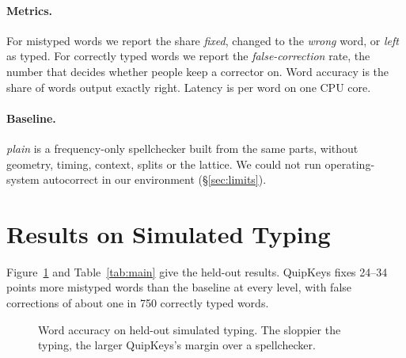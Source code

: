 \documentclass[11pt,a4paper]{article}
\newcommand{\qk}{QuipKeys}
\begin{document}
\paragraph{Metrics.} For mistyped words we report the share \emph{fixed}, changed to the \emph{wrong} word, or \emph{left} as typed. For correctly typed words we report the \emph{false-correction} rate, the number that decides whether people keep a corrector on. Word accuracy is the share of words output exactly right. Latency is per word on one CPU core.

\paragraph{Baseline.} \emph{plain} is a frequency-only spellchecker built from the same parts, without geometry, timing, context, splits or the lattice. We could not run operating-system autocorrect in our environment (\S\ref{sec:limits}).

\section{Results on Simulated Typing}

Figure~\ref{fig:simacc} and Table~\ref{tab:main} give the held-out results. \qk{} fixes 24--34 points more mistyped words than the baseline at every level, with false corrections of about one in 750 correctly typed words.

\begin{figure}[t]
\centering
{}
\caption{Word accuracy on held-out simulated typing. The sloppier the typing, the larger \qk{}'s margin over a spellchecker.}
\label{fig:simacc}
\end{figure}
\end{document}
